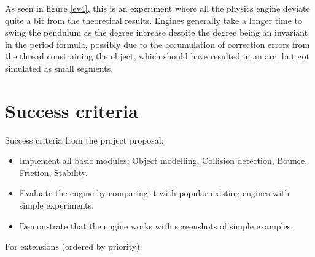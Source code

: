 \documentclass[12pt,a4paper,twoside,openright]{report}
\begin{document}
As seen in figure \ref{ev4}, this is an experiment where all the physics engine deviate quite a bit from the theoretical results. Engines generally take a longer time to swing the pendulum as the degree increase despite the degree being an invariant in the period formula, possibly due to the accumulation of correction errors from the thread constraining the object, which should have resulted in an arc, but got simulated as small segments.

\section{Success criteria}

Success criteria from the project proposal:

\begin{itemize}

\item Implement all basic modules: Object modelling, Collision detection, Bounce, Friction, Stability.

\item Evaluate the engine by comparing it with popular existing engines with simple experiments.

\item Demonstrate that the engine works with screenshots of simple examples.
\end{itemize}

For extensions (ordered by priority):
\end{document}
